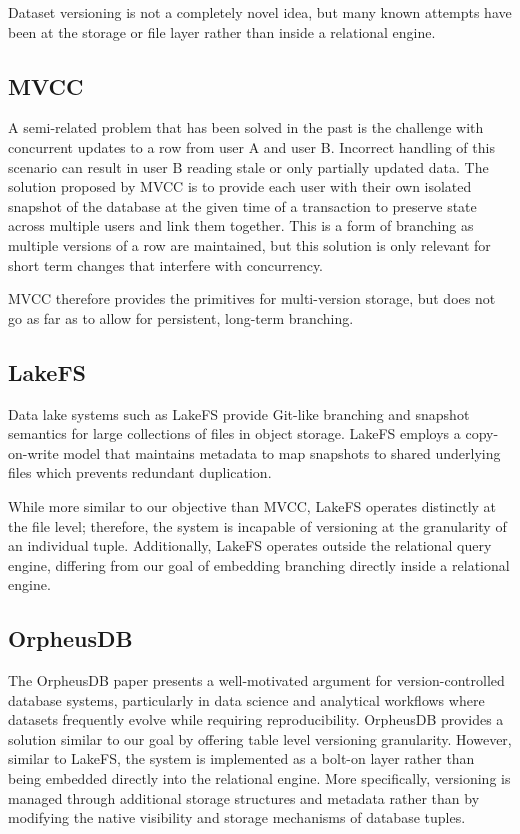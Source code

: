 \documentclass[sigplan, nonacm]{acmart}
\begin{document}
Dataset versioning is not a completely novel idea, but many known attempts have been at the storage or file layer rather than inside a relational engine.

\subsection{MVCC}
A semi-related problem that has been solved in the past is the challenge with concurrent updates to a row from user A and user B. Incorrect handling of this scenario can result in user B reading stale or only partially updated data. The solution proposed by MVCC \cite{ssi} is to provide each user with their own isolated snapshot of the database at the given time of a transaction to preserve state across multiple users and link them together. This is a form of branching as multiple versions of a row are maintained, but this solution is only relevant for short term changes that interfere with concurrency.

MVCC therefore provides the primitives for multi-version storage, but does not go as far as to allow for persistent, long-term branching.

\subsection{LakeFS}
Data lake systems such as LakeFS \cite{lakefs} provide Git-like branching and snapshot semantics for large collections of files in object storage. LakeFS employs a copy-on-write model that maintains metadata to map snapshots to shared underlying files which prevents redundant duplication.

While more similar to our objective than MVCC, LakeFS operates distinctly at the file level; therefore, the system is incapable of versioning at the granularity of an individual tuple. Additionally, LakeFS operates outside the relational query engine, differing from our goal of embedding branching directly inside a relational engine.

\subsection{OrpheusDB}
The OrpheusDB paper \cite{orpheusdb} presents a well-motivated argument for version-controlled database systems, particularly in data science and analytical workflows where datasets frequently evolve while requiring reproducibility. OrpheusDB provides a solution similar to our goal by offering table level versioning granularity. However, similar to LakeFS, the system is implemented as a bolt-on layer rather than being embedded directly into the relational engine. More specifically, versioning is managed through additional storage structures and metadata rather than by modifying the native visibility and storage mechanisms of database tuples.




\pagestyle{plain}
\end{document}

